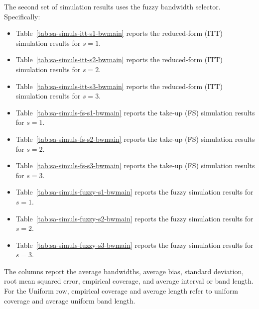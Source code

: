 \documentclass[10pt]{article}
\begin{document}
The second set of simulation results uses the fuzzy bandwidth selector. Specifically:
\begin{itemize}
    \item Table~\ref{tab:sa-simuls-itt-s1-bwmain} reports the reduced-form (ITT) simulation results for $s=1$.
    \item Table~\ref{tab:sa-simuls-itt-s2-bwmain} reports the reduced-form (ITT) simulation results for $s=2$.
    \item Table~\ref{tab:sa-simuls-itt-s3-bwmain} reports the reduced-form (ITT) simulation results for $s=3$.
    \item Table~\ref{tab:sa-simuls-fs-s1-bwmain} reports the take-up (FS) simulation results for $s=1$.
    \item Table~\ref{tab:sa-simuls-fs-s2-bwmain} reports the take-up (FS) simulation results for $s=2$.
    \item Table~\ref{tab:sa-simuls-fs-s3-bwmain} reports the take-up (FS) simulation results for $s=3$.
    \item Table~\ref{tab:sa-simuls-fuzzy-s1-bwmain} reports the fuzzy simulation results for $s=1$.
    \item Table~\ref{tab:sa-simuls-fuzzy-s2-bwmain} reports the fuzzy simulation results for $s=2$.
    \item Table~\ref{tab:sa-simuls-fuzzy-s3-bwmain} reports the fuzzy simulation results for $s=3$.
\end{itemize}
The columns report the average bandwidths, average bias, standard deviation, root mean squared error, empirical coverage, and average interval or band length. For the Uniform row, empirical coverage and average length refer to uniform coverage and average uniform band length.

\clearpage
\end{document}
